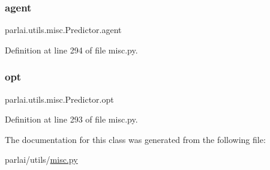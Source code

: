 \subsubsection{\texorpdfstring{agent}{agent}}
{\footnotesize\ttfamily parlai.\+utils.\+misc.\+Predictor.\+agent}



Definition at line 294 of file misc.\+py.

\mbox{\label{classparlai_1_1utils_1_1misc_1_1Predictor_a608b3d7f6722389f3a7eeed0ec5772b7}} 
\subsubsection{\texorpdfstring{opt}{opt}}
{\footnotesize\ttfamily parlai.\+utils.\+misc.\+Predictor.\+opt}



Definition at line 293 of file misc.\+py.



The documentation for this class was generated from the following file\+:\begin{DoxyCompactItemize}
\item 
parlai/utils/\hyperlink{misc_8py}{misc.\+py}\end{DoxyCompactItemize}
